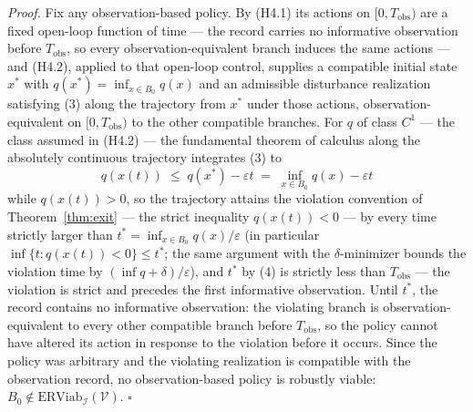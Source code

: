 \documentclass[11pt]{article}
\theoremstyle{definition}
\begin{document}
\emph{Proof.} Fix any observation-based policy. By (H4.1) its actions on
\([0, T_{\mathrm{obs}})\) are a fixed open-loop function of time --- the
record carries no informative observation before \(T_{\mathrm{obs}}\),
so every observation-equivalent branch induces the same actions --- and
(H4.2), applied to that open-loop control, supplies a compatible initial
state \(x^*\) with \(q(x^*) = \inf_{x \in B_0} q(x)\) and an admissible
disturbance realization satisfying (3) along the trajectory from \(x^*\)
under those actions, observation-equivalent on \([0, T_{\mathrm{obs}})\)
to the other compatible branches. For \(q\) of class \(C^1\) --- the
class assumed in (H4.2) --- the fundamental theorem of calculus along
the absolutely continuous trajectory integrates (3) to
\[q(x(t)) \;\le\; q(x^*) - \varepsilon t \;=\; \inf_{x \in B_0} q(x) - \varepsilon t\]
while \(q(x(t)) > 0\), so the trajectory attains the violation
convention of Theorem~\ref{thm:exit} --- the strict inequality \(q(x(t)) < 0\) --- by
every time strictly larger than
\(t^* = \inf_{x \in B_0} q(x) / \varepsilon\) (in particular
\(\inf\{ t : q(x(t)) < 0 \} \le t^*\); the same argument with the
\(\delta\)-minimizer bounds the violation time by
\((\inf q + \delta)/\varepsilon\)), and \(t^*\) by (4) is strictly less
than \(T_{\mathrm{obs}}\) --- the violation is strict and precedes the
first informative observation. Until \(t^*\), the record contains no
informative observation: the violating branch is observation-equivalent
to every other compatible branch before \(T_{\mathrm{obs}}\), so the
policy cannot have altered its action in response to the violation
before it occurs. Since the policy was arbitrary and the violating
realization is compatible with the observation record, no
observation-based policy is robustly viable:
\(B_0 \notin \mathrm{ERViab}_{\mathcal{I}}(\mathcal{V})\). \ensuremath{\square}
\end{document}
